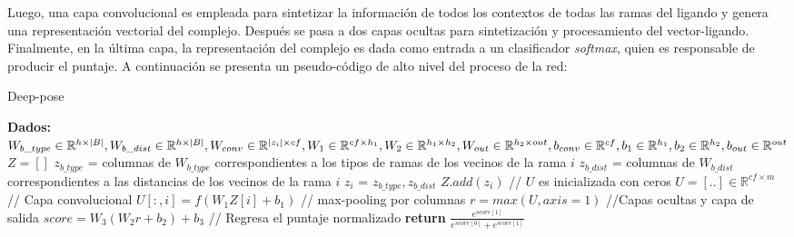 Luego, una capa convolucional es empleada para sintetizar la
información de todos los contextos de todas las ramas del ligando y
genera una representación vectorial del complejo. Después se pasa a
dos capas ocultas para sintetización y procesamiento del
vector-ligando. Finalmente, en la última capa, la representación del
complejo es dada como entrada a un clasificador \textit{softmax},
quien es responsable de producir el puntaje. A continuación se
presenta un pseudo-código de alto nivel del proceso de la red:
\begin{algorithm}
  \caption{Deep-pose}
  \begin{algorithmic}[1]
    \State \textbf{Dados:}\newline
                           $W_{b\_type} \in \mathbb{R}^{h\times |B|}, W_{b\_dist}
                           \in \mathbb{R}^{h\times |B|},\newline
                           W_{conv} \in \mathbb{R}^{|z_i| \times cf}, W_1 \in
                           \mathbb{R}^{cf \times h_1},\newline
                           W_2 \in \mathbb{R}^{h_1 \times h_2}, W_{out} \in
                           \mathbb{R}^{h_2 \times out},\newline
                           b_{conv} \in \mathbb{R}^{cf}, b_{1} \in
                           \mathbb{R}^{h_1},\newline
                           b_{2} \in \mathbb{R}^{h_2}, b_{out}
                           \in \mathbb{R}^{out}$
    \State $Z = []$
      \State $z_{b\_type}$ = columnas de $W_{b\_type}$
      correspondientes a los tipos de ramas de los vecinos de la
      rama $i$
      \State $z_{b\_dist}$ = columnas de $W_{b\_dist}$
      correspondientes a las distancias de los vecinos de la rama $i$
      \State $z_i$ = {$z_{b\_type}, z_{b\_dist}$}
      \State $Z.add(z_i)$
    \EndFor
    \State // $U$ es inicializada con ceros
    \State $U = [..] \in \mathbb{R}^{cf \times m}$
    \State // Capa convolucional
      \State $U[:,i]=f(W_1Z[i] + b_1)$
    \EndFor
    \State // max-pooling por columnas
    \State $r=max(U, axis=1)$
    \State //Capas ocultas y capa de salida
    \State $score=W_3(W_2r + b_2) + b_3$
    \State // Regresa el puntaje normalizado
    \State \textbf{return} $\frac{e^{score[1]}}{e^{score[0]}+e^{score[1]}}$
  \end{algorithmic}
\end{algorithm}
